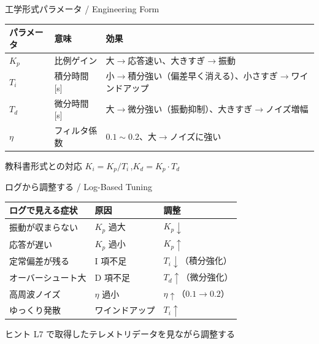 \documentclass[aspectratio=169, 14pt]{beamer}
\begin{document}
\begin{frame}{工学形式パラメータ / Engineering Form}
  \begin{table}
    \centering
    \footnotesize
    \begin{tabular}{llp{55mm}}
      \hline
      \textbf{パラメータ} & \textbf{意味} & \textbf{効果} \\
      \hline
      $K_p$  & 比例ゲイン   & 大$\to$応答速い、大きすぎ$\to$振動 \\
      $T_i$  & 積分時間 [s] & 小$\to$積分強い（偏差早く消える）、小さすぎ$\to$ワインドアップ \\
      $T_d$  & 微分時間 [s] & 大$\to$微分強い（振動抑制）、大きすぎ$\to$ノイズ増幅 \\
      $\eta$ & フィルタ係数  & $0.1 \sim 0.2$、大$\to$ノイズに強い \\
      \hline
    \end{tabular}
  \end{table}

  \vspace{0.5em}

  \begin{block}{教科書形式との対応}
    $K_i = K_p / T_i$\,,\quad $K_d = K_p \cdot T_d$
  \end{block}
\end{frame}

\begin{frame}{ログから調整する / Log-Based Tuning}
  \begin{table}
    \centering
    \footnotesize
    \begin{tabular}{lll}
      \hline
      \textbf{ログで見える症状} & \textbf{原因} & \textbf{調整} \\
      \hline
      振動が収まらない   & $K_p$ 過大          & $K_p\!\downarrow$ \\
      応答が遅い         & $K_p$ 過小          & $K_p\!\uparrow$ \\
      定常偏差が残る     & I 項不足            & $T_i\!\downarrow$（積分強化）\\
      オーバーシュート大 & D 項不足            & $T_d\!\uparrow$（微分強化）\\
      高周波ノイズ       & $\eta$ 過小         & $\eta\!\uparrow$（$0.1\!\to\!0.2$）\\
      ゆっくり発散       & ワインドアップ      & $T_i\!\uparrow$ \\
      \hline
    \end{tabular}
  \end{table}

  \vspace{0.5em}

  \begin{block}{ヒント}
    L7 で取得したテレメトリデータを見ながら調整する
  \end{block}
\end{frame}
\end{document}

